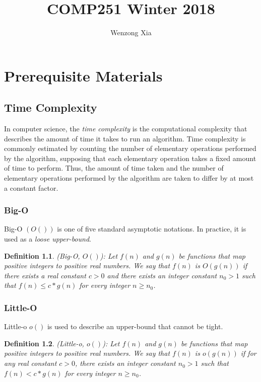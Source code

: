 \documentclass[11pt, a4paper, oneside]{book}
\author{Wenzong Xia}
\title{COMP251 Winter 2018}
\theoremstyle{theoremdd}
\newtheorem*{definition}{Definition}
\theoremstyle{remark}
\begin{document}
\maketitle
\tableofcontents
\frontmatter


\chapter{Prerequisite Materials}
\section*{Time Complexity}
In computer science, the \textit{time complexity} is the computational complexity that describes the amount of time it takes to run an algorithm. Time complexity is commonly estimated by counting the number of elementary operations performed by the algorithm, supposing that each elementary operation takes a fixed amount of time to perform. Thus, the amount of time taken and the number of elementary operations performed by the algorithm are taken to differ by at most a constant factor. 

\subsection*{Big-O}
Big-O $(O())$ is one of five standard asymptotic notations. In practice, it is used as a \textit{loose upper-bound}.
\begin{definition}
(Big-O, $O()$): Let $f(n)$ and $g(n)$ be functions that map positive integers to positive real numbers. We say that $f(n)$ is $O(g(n))$ if there exists a real constant $c>0$ and there exists an integer constant $n_{0} > 1$ such that $f(n) \leq c*g(n)$ for every integer $n\geq n_{0}$.
\end{definition}

\subsection*{Little-O}
Little-o $o()$ is used to describe an upper-bound that cannot be tight. 
\begin{definition}
(Little-o, $o()$): Let $f(n)$ and $g(n)$ be functions that map positive integers to positive real numbers. We say that $f(n)$ is $o(g(n))$ if for any real constant $c>0$, there exists an integer constant $n_{0} > 1$ such that $f(n) < c*g(n)$ for every integer $n\geq n_{0}$.
\end{definition}
\end{document}
